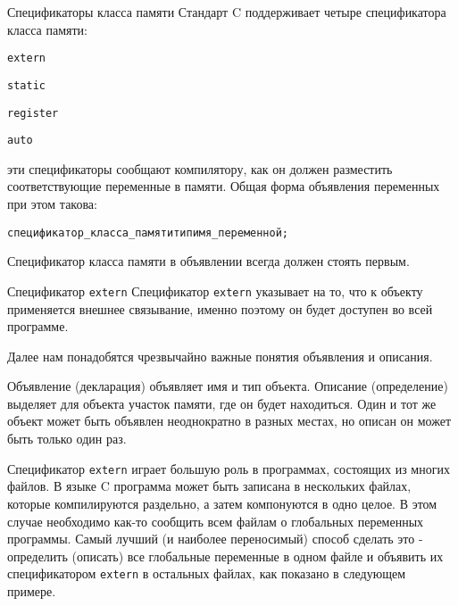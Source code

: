\documentclass[xcolor=table]{beamer}
\begin{document}
\begin{frame}{Спецификаторы класса памяти}
    Стандарт C поддерживает четыре спецификатора класса памяти:
    \begin{alltt}
        extern
        
        static
        
        register
        
        auto
    \end{alltt}
    
    эти спецификаторы сообщают компилятору, как он должен разместить соответствующие переменные в памяти. Общая форма объявления переменных при этом такова:
    \begin{alltt}
        спецификатор\_класса\_памяти тип имя\_переменной;
    \end{alltt}
    
    Спецификатор класса памяти в объявлении всегда должен стоять первым.
\end{frame}

\begin{frame}{Спецификатор \texttt{extern}}
    Спецификатор \texttt{extern} указывает на то, что к объекту применяется внешнее связывание, именно поэтому он будет доступен во всей программе.
    
    Далее нам понадобятся чрезвычайно важные понятия объявления и описания.
    
    Объявление (декларация) объявляет имя и тип объекта. Описание (определение) выделяет для объекта участок памяти, где он будет находиться. Один и тот же объект может быть объявлен неоднократно в разных местах, но описан он может быть только один раз.
    
    Спецификатор \texttt{extern} играет большую роль в программах, состоящих из многих файлов. В языке C программа может быть записана в нескольких файлах, которые компилируются раздельно, а затем компонуются в одно целое. В этом случае необходимо как-то сообщить всем файлам о глобальных переменных программы. Самый лучший (и наиболее переносимый) способ сделать это - определить (описать) все глобальные переменные в одном файле и объявить их спецификатором \texttt{extern} в остальных файлах, как показано в следующем примере.
\end{frame}
\end{document}
